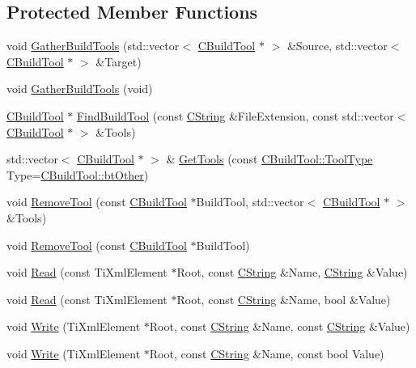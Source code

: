 \subsection*{Protected Member Functions}
\begin{DoxyCompactItemize}
\item 
void \hyperlink{classCToolChain_aefdda06e5809ed3cb495e702012a22c5}{Gather\-Build\-Tools} (std\-::vector$<$ \hyperlink{classCBuildTool}{C\-Build\-Tool} $\ast$ $>$ \&Source, std\-::vector$<$ \hyperlink{classCBuildTool}{C\-Build\-Tool} $\ast$ $>$ \&Target)
\item 
void \hyperlink{classCToolChain_ab6abdc5bf1c18fb31fcd4c61ddf6c83e}{Gather\-Build\-Tools} (void)
\item 
\hyperlink{classCBuildTool}{C\-Build\-Tool} $\ast$ \hyperlink{classCToolChain_a428c84f93d609a49f44e3593be267219}{Find\-Build\-Tool} (const \hyperlink{classCString}{C\-String} \&File\-Extension, const std\-::vector$<$ \hyperlink{classCBuildTool}{C\-Build\-Tool} $\ast$ $>$ \&Tools)
\item 
std\-::vector$<$ \hyperlink{classCBuildTool}{C\-Build\-Tool} $\ast$ $>$ \& \hyperlink{classCToolChain_a5c82d30a1c4b3d03224bd1b99d868460}{Get\-Tools} (const \hyperlink{classCBuildTool_a1a622843617ddf9b0ebb1c09c3437e6d}{C\-Build\-Tool\-::\-Tool\-Type} Type=\hyperlink{classCBuildTool_a1a622843617ddf9b0ebb1c09c3437e6dab1bafc4d8b635a113d8aa8df402db376}{C\-Build\-Tool\-::bt\-Other})
\item 
void \hyperlink{classCToolChain_ae306d261e825581979e8c04b07b3ff6a}{Remove\-Tool} (const \hyperlink{classCBuildTool}{C\-Build\-Tool} $\ast$Build\-Tool, std\-::vector$<$ \hyperlink{classCBuildTool}{C\-Build\-Tool} $\ast$ $>$ \&Tools)
\item 
void \hyperlink{classCToolChain_a9231aa02f75e69ff41cc1393175c712d}{Remove\-Tool} (const \hyperlink{classCBuildTool}{C\-Build\-Tool} $\ast$Build\-Tool)
\item 
void \hyperlink{classCToolChain_a0b8d6c7d661dbcc554e07ade2454d019}{Read} (const Ti\-Xml\-Element $\ast$Root, const \hyperlink{classCString}{C\-String} \&Name, \hyperlink{classCString}{C\-String} \&Value)
\item 
void \hyperlink{classCToolChain_a1b3a1ec652c21646a617223df8603154}{Read} (const Ti\-Xml\-Element $\ast$Root, const \hyperlink{classCString}{C\-String} \&Name, bool \&Value)
\item 
void \hyperlink{classCToolChain_a424d78b439daac76767e205e2c2ee068}{Write} (Ti\-Xml\-Element $\ast$Root, const \hyperlink{classCString}{C\-String} \&Name, const \hyperlink{classCString}{C\-String} \&Value)
\item 
void \hyperlink{classCToolChain_acd131e3b623c6fc123ffe4b9d8e62bc0}{Write} (Ti\-Xml\-Element $\ast$Root, const \hyperlink{classCString}{C\-String} \&Name, const bool Value)
\end{DoxyCompactItemize}
